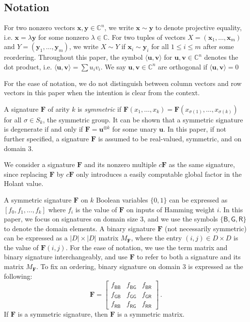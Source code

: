 \documentclass[11pt]{article}
\newcommand{\db}{\mathsf{B}}
\newcommand{\dg}{\mathsf{G}}
\newcommand{\dr}{\mathsf{R}}
\begin{document}
\subsection{Notation} \label{subsec:notations}
For two nonzero vectors $\mathbf{x}, \mathbf{y} \in \mathbb{C}^n$, we write $\mathbf{x} \sim \mathbf{y}$ to denote projective equality, i.e. $\mathbf{x} = \lambda \mathbf{y}$ for some nonzero $\lambda \in \mathbb{C}$.
For two tuples of vectors $X = (\mathbf{x}_1, \ldots, \mathbf{x}_m)$ and $Y = (\mathbf{y}_1, \ldots, \mathbf{y}_m)$, we write $X \sim Y$ if $\mathbf{x}_i \sim \mathbf{y}_i$ for all $1 \le i \le m$ after some reordering.
Throughout this paper, the symbol $\langle \mathbf{u}, \mathbf{v} \rangle$ for $\mathbf{u}, \mathbf{v} \in \mathbb{C}^n$ denotes the dot product,
i.e. $\langle \mathbf{u}, \mathbf{v} \rangle = \sum u_i v_i$.
We say $\mathbf{u}, \mathbf{v} \in \mathbb{C}^n$ are orthogonal if $\langle \mathbf{u}, \mathbf{v} \rangle = 0$

For the ease of notation, we do not distinguish between column vectors and row vectors in this paper when the intention is clear from the context.

A signature $\mathbf{F}$ of arity $k$ is \textit{symmetric} if $\mathbf{F}(x_1, \ldots, x_k) = \mathbf{F}(x_{\sigma(1)}, \ldots, x_{\sigma(k)})$ for all $\sigma \in S_k$, the symmetric group.
It can be shown that a symmetric signature is degenerate if and only if $\mathbf{F} = \mathbf{u}^{\otimes k}$ for some unary $\mathbf{u}$.
In this paper, if not further specified, a signature $\mathbf{F}$ is assumed to be real-valued, symmetric, and on domain $3$.

We consider a signature $\mathbf{F}$ and its nonzero multiple $c \mathbf{F}$ as the same signature, since replacing $\mathbf{F}$ by $c \mathbf{F}$ only introduces a easily computable global factor in the Holant value.

A symmetric signature $\mathbf{F}$ on $k$ Boolean variables $\{0, 1\}$ can be expressed as $[f_0, f_1, \ldots, f_k]$ where $f_i$ is the value of $\mathbf{F}$ 
on inputs of Hamming weight $i$.
In this paper, we focus on signatures on domain size $3$, and we use the symbols $\{\db, \dg, \dr\}$ to denote the domain elements.
A binary signature $\mathbf{F}$ (not necessarily symmetric) can be expressed as a $\lvert D \rvert \times \lvert D \rvert$ matrix $M_{\mathbf{F}}$, where the entry $(i, j) \in D \times D$
is the value of $\mathbf{F}(i, j)$.
For the ease of notation, we use the term matrix and binary signature interchangeably, and use $\mathbf{F}$ to refer to both a signature and its matrix $M_{\mathbf{F}}$.
To fix an ordering, binary signature on domain $3$ is expressed as the following:
\[
  \mathbf{F} = \begin{bmatrix}
    f_{\db\db} & f_{\db \dg} & f_{\db \dr} \\
    f_{\dg \db} & f_{\dg \dg} & f_{\dg \dr} \\
    f_{\dr \db} & f_{\dr \dg} & f_{\dr \dr} 
  \end{bmatrix} \, .
\]
If $\mathbf{F}$ is a symmetric signature, then $\mathbf{F}$ is a symmetric matrix.
\end{document}
